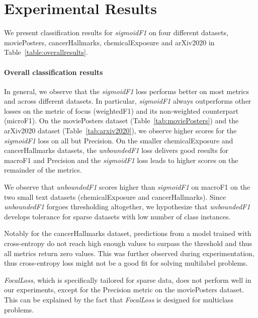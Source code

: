 
\section{Experimental Results}
\label{sec:orgc23a664}

We present classification results for \textit{sigmoidF1} on four different datasets, movie\-Posters, cancerHallmarks, chemicalExposure and arXiv2020 in Table~\ref{table:overallresults}.

\paragraph{Overall classification results}

In general, we observe that the \emph{sigmoidF1} loss performs better on most metrics and across different datasets. In particular, \emph{sigmoidF1} always outperforms other losses on the metric of focus (weightedF1) and its non-weighted counterpart (microF1).
On the moviePosters dataset (Table~\ref{tab:moviePosters}) and the arXiv2020 dataset (Table~\ref{tab:arxiv2020}), we observe higher scores for the \emph{sigmoidF1} loss on all but Precision.
On the smaller chemicalExposure and cancerHallmarks datasets, the \emph{unboundedF1} loss delivers good results for macroF1 and Precision and the \emph{sigmoidF1} loss leads to higher scores on the remainder of the metrics.

We observe that \emph{unboundedF1} scores higher than \emph{sigmoidF1} on macroF1 on the two small text datasets (chemicalExposure and cancerHallmarks). Since \emph{unboundedF1} forgoes thresholding altogether, we hypothesize that \emph{unboundedF1} develops tolerance for sparse datasets with low number of class instances.

Notably for the cancerHallmarks dataset, predictions from a model trained with cross-entropy do not reach high enough values to surpass the threshold and thus all metrics return zero values. This was further observed during experimentation, thus cross-entropy loss might not be a good fit for solving multilabel problems.


\emph{FocalLoss}, which is specifically tailored for sparse data, does not perform well in our experiments, except for the Precision metric on the moviePosters dataset. This can be explained by the fact that \emph{FocalLoss} is designed for multiclass problems.

